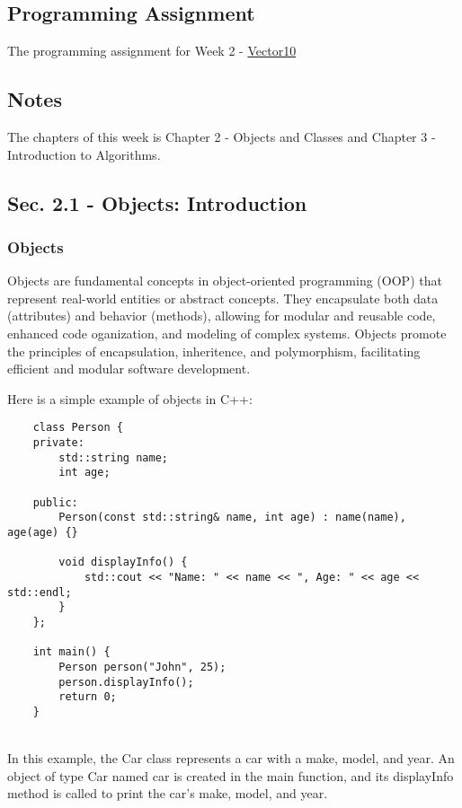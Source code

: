 \subsection{Programming Assignment}
The programming assignment for Week 2 - \href{https://github.com/cu-cspb-2270-Summer-2023/pa1-RelativiBit}{Vector10}

\subsection{Notes} 
The chapters of this week is Chapter 2 - Objects and Classes and Chapter 3 - Introduction to Algorithms. \\

\subsection*{Sec. 2.1 - Objects: Introduction}
\subsubsection*{Objects}

Objects are fundamental concepts in object-oriented programming (OOP) that represent real-world entities or abstract concepts. They encapsulate both data (attributes) and behavior (methods), allowing for modular and reusable
code, enhanced code oganization, and modeling of complex systems. Objects promote the principles of encapsulation, inheritence, and polymorphism, facilitating efficient and modular software development.

\begin{solution}
    Here is a simple example of objects in C++: \\
    \horizontalline
    \begin{verbatim}
    class Person {
    private:
        std::string name;
        int age;
    
    public:
        Person(const std::string& name, int age) : name(name), age(age) {}

        void displayInfo() {
            std::cout << "Name: " << name << ", Age: " << age << std::endl;
        }
    };

    int main() {
        Person person("John", 25);
        person.displayInfo();
        return 0;
    }
    \end{verbatim} \\
    \horizontalline
    In this example, the Car class represents a car with a make, model, and year. An object of type Car named car is created in the main function, and its displayInfo method is called to print the car's make, model, and year.
\end{solution}

